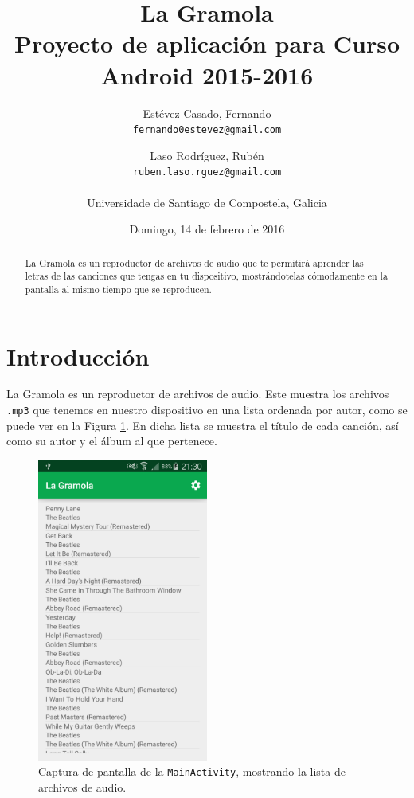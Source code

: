 \documentclass[10pt,a4paper]{article}
\renewcommand{\abstractname}{Resumen}
\begin{document}
\title{La Gramola \\\normalsize Proyecto de aplicación para Curso Android 2015-2016}
\author{
	Estévez Casado, Fernando\\
	\texttt{fernando0estevez@gmail.com}
	\and 
	Laso Rodríguez, Rubén
	\\
	\texttt{ruben.laso.rguez@gmail.com}\\
\\Universidade de Santiago de Compostela, Galicia}
\date{Domingo, 14 de febrero de 2016}
\maketitle

\begin{abstract}
La Gramola es un reproductor de archivos de audio que te permitirá aprender las letras de las canciones que tengas en tu dispositivo, mostrándotelas cómodamente en la pantalla al mismo tiempo que se reproducen.
\end{abstract}

\tableofcontents
\newpage
\renewcommand{\abstractname}{Resumen}
\renewcommand{\tablename}{Tabla}
\renewcommand{\figurename}{Figura}

\section{Introducción}
La Gramola es un reproductor de archivos de audio. Este muestra los archivos \texttt{.mp3} que tenemos en nuestro dispositivo en una lista ordenada por autor, como se puede ver en la Figura \ref{fig:lista}. En dicha lista se muestra el título de cada canción, así como su autor y el álbum al que pertenece. 

\begin{figure}[htbp]
	\centering
		\includegraphics[width=0.5\textwidth]{capturas/lista.png}
	\caption{Captura de pantalla de la \texttt{MainActivity}, mostrando la lista de archivos de audio.}
	\label{fig:lista}
\end{figure}
\end{document}
